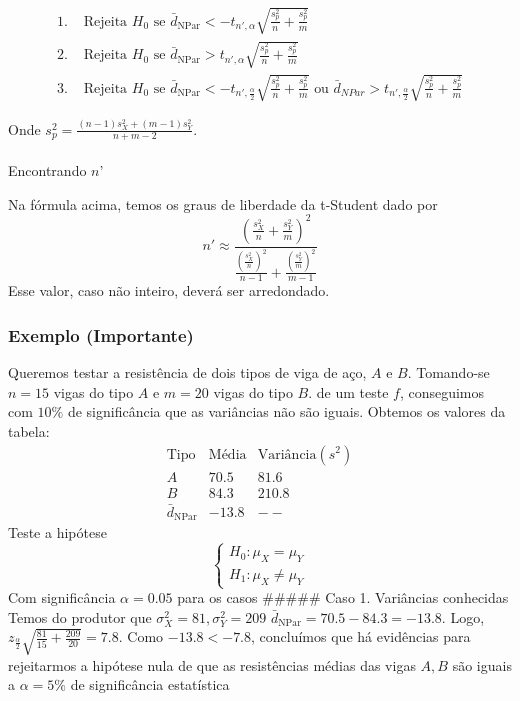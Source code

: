 \documentclass[
  letterpaper,
  DIV=11,
  numbers=noendperiod]{scrreprt}
\makeatletter
\let\oldparagraph\paragraph
\renewcommand{\paragraph}{
    \@ifstar
      \xxxParagraphStar
      \xxxParagraphNoStar
  }
\newcommand{\xxxParagraphStar}[1]{\oldparagraph*{#1}\mbox{}}
\newcommand{\xxxParagraphNoStar}[1]{\oldparagraph{#1}\mbox{}}
\makeatother
\begin{document}
\[
\begin{aligned}
1. &\text{ Rejeita $H_{0}$ se } \bar{d}_{\mathrm{NPar}} < -t_{n',\alpha} \sqrt{ \frac{s_{p}^2}{n} + \frac{s_{p}^2}{m} } \\
2. & \text{ Rejeita $H_{0}$ se } \bar{d}_{\mathrm{NPar}} > t_{n',\alpha} \sqrt{ \frac{s^2_{p}}{n} + \frac{s^2_{p}}{m} } \\
3. & \text{ Rejeita $H_{0}$ se } \bar{d}_{\mathrm{NPar}} < -t_{n',\frac{\alpha}{2}} \sqrt{\frac{s^2_{p}}{n} + \frac{s^2_{p}}{m}}
\text{ ou } \bar{d}_{NPar} > t_{n', \frac{\alpha}{2}} \sqrt{ \frac{s^2_{p}}{n} + \frac{s^2_{p}}{m} }
\end{aligned}
\]

Onde \(s^2_{p}= \frac{(n-1)s^2_{X}+(m-1)s^2_{Y}}{n+m-2}\).

\paragraph{\texorpdfstring{Encontrando
\(n’\)}{Encontrando n'}}\label{encontrando-n}

Na fórmula acima, temos os graus de liberdade da t-Student dado por \[
n' \approx \frac{\left(\frac{s^2_{X}}{n}+\frac{s^2_{Y}}{m}\right)^2}{\frac{\left(\frac{s^2_{X}}{n}\right)^2}
{n-1}+\frac{\left(\frac{s^2_{Y}}{m}\right)^2}{m-1}}
\] Esse valor, caso não inteiro, deverá ser arredondado.

\subsubsection{Exemplo (Importante)}\label{exemplo-importante}

Queremos testar a resistência de dois tipos de viga de aço, \(A\) e
\(B\). Tomando-se \(n=15\) vigas do tipo \(A\) e \(m=20\) vigas do tipo
\(B\). de um teste \(f\), conseguimos com \(10\%\) de significância que
as variâncias não são iguais. Obtemos os valores da tabela: \[
\begin{array}{c|c}
\text{Tipo}  & \text{Média}  & \text{Variância} (s^2) \\
\hline
A & 70.5 & 81.6 \\
B  & 84.3  & 210.8 \\
\bar{d}_{\mathrm{NPar}}  & -13.8 & --
\end{array}
\] Teste a hipótese \[
\begin{cases}
H_{0} : \mu_{X} = \mu_{Y} \\
H_{1}:\mu_{X} \neq \mu_{Y}
\end{cases}
\] Com significância \(\alpha = 0.05\) para os casos \#\#\#\#\# Caso 1.
Variâncias conhecidas Temos do produtor que
\(\sigma^2_{X}=81, \sigma^2_{Y}=209\)
\(\bar{d}_{\mathrm{NPar}}=70.5-84.3 = -13.8\). Logo,
\(z_{\frac{\alpha}{2}}\sqrt{ \frac{81}{15} + \frac{209}{20}}=7.8\). Como
\(-13.8 < -7.8\), concluímos que há evidências para rejeitarmos a
hipótese nula de que as resistências médias das vigas \(A,B\) são iguais
a \(\alpha = 5\%\) de significância estatística
\end{document}

